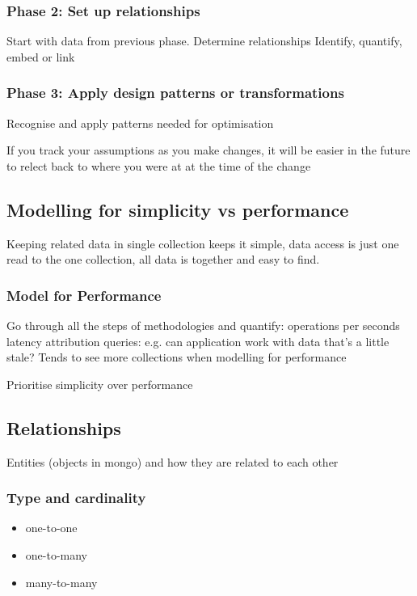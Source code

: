 \documentclass[11pt]{article}
\begin{document}
\subsubsection{Phase 2: Set up relationships}
\label{sec:org417ce45}
Start with data from previous phase. Determine relationships
Identify, quantify, embed or link

\subsubsection{Phase 3: Apply design patterns or transformations}
\label{sec:org726f664}
Recognise and apply patterns needed for optimisation

If you track your assumptions as you make changes, it will be easier in the future to relect back to where you were at at the time of the change


\subsection{Modelling for simplicity vs performance}
\label{sec:orgaee798e}
Keeping related data in single collection keeps it simple, data access is just one read to the one collection, all data is together and easy to find.

\subsubsection{Model for Performance}
\label{sec:orgef667a3}
Go through all the steps of methodologies and quantify:
operations per seconds
latency
attribution queries: e.g. can application work with data that's a little stale?
Tends to see more collections when modelling for performance


Prioritise simplicity over performance

\subsection{Relationships}
\label{sec:org4b25034}
Entities (objects in mongo) and how they are related to each other

\subsubsection{Type and cardinality}
\label{sec:orge993382}
\begin{itemize}
\item one-to-one
\item one-to-many
\item many-to-many
\end{itemize}
\end{document}
